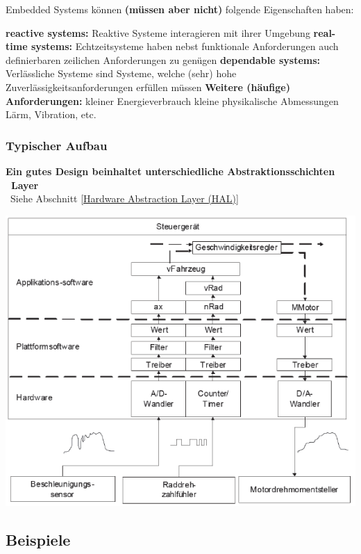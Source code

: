 Embedded Systems können \textbf{(müssen aber nicht)} folgende Eigenschaften haben:

\begin{outline}
    \1 \textbf{reactive systems:}  Reaktive Systeme interagieren mit ihrer Umgebung
    \1 \textbf{real-time systems:} Echtzeitsysteme haben nebst funktionale Anforderungen auch definierbaren zeilichen Anforderungen zu genügen
    \1 \textbf{dependable systems:} Verlässliche Systeme sind Systeme, welche (sehr) hohe Zuverlässigkeitsanforderungen erfüllen müssen
    \1 \textbf{Weitere (häufige) Anforderungen:} 
        \2 kleiner Energieverbrauch
        \2 kleine physikalische Abmessungen
        \2 Lärm, Vibration, etc.
\end{outline}


\subsubsection{Typischer Aufbau}

\textbf{Ein gutes Design beinhaltet unterschiedliche Abstraktionsschichten \textrightarrow\ Layer} \\
\textrightarrow\ Siehe Abschnitt \ref{Hardware Abstraction Layer (HAL)}

\begin{center}
    \includegraphics[width=0.8\columnwidth]{images/embedded_system_aufbau_schichten.pdf}
\end{center}


\subsection{Beispiele}

\vspace{-0.2cm}

